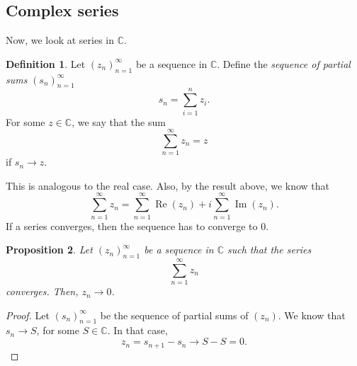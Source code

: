 \documentclass[a4paper, openany]{memoir}
\theoremstyle{definition}
\newtheorem{definition}{Definition}[section]
\theoremstyle{plain}
\newtheorem{proposition}[definition]{Proposition}
\begin{document}

\subsection{Complex series}
Now, we look at series in $\mathbb{C}$.
\begin{definition}
Let $(z_n)_{n=1}^{\infty}$ be a sequence in $\mathbb{C}$. Define the \emph{sequence of partial sums} $(s_n)_{n=1}^{\infty}$
\[s_n = \sum_{i=1}^n z_i.\]
For some $z \in \mathbb{C}$, we say that the sum
\[\sum_{n=1}^{\infty} z_n = z\]
if $s_n \to z$.
\end{definition}
\noindent This is analogous to the real case. Also, by the result above, we know that
\[\sum_{n=1}^{\infty} z_n = \sum_{n=1}^{\infty} \operatorname{Re}(z_n) + i \sum_{n=1}^{\infty} \operatorname{Im}(z_n).\]
\noindent If a series converges, then the sequence has to converge to 0.
\begin{proposition}
Let $(z_n)_{n=1}^{\infty}$ be a sequence in $\mathbb{C}$ such that the series 
\[\sum_{n=1}^{\infty} z_n\] 
converges. Then, $z_n \to 0$.
\end{proposition}
\begin{proof}
Let $(s_n)_{n=1}^{\infty}$ be the sequence of partial sums of $(z_n)$. We know that $s_n \to S$, for some $S \in \mathbb{C}$. In that case,
\[z_n = s_{n+1} - s_n \to S - S = 0.\]
\end{proof}
\end{document}
